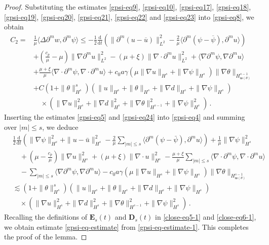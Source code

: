 \documentclass[10pt,a4paper]{amsart}
\def\d{\mathrm{d}}
\def\no{\nonumber}
\def\w{\mathfrak{w}}
\begin{document}
\begin{proof}
Substituting the estimates \eqref{gpsi-eq9}, \eqref{gpsi-eq10}, \eqref{gpsi-eq17}, \eqref{gpsi-eq18}, \eqref{gpsi-eq19}, \eqref{gpsi-eq20}, \eqref{gpsi-eq21}, \eqref{gpsi-eq22} and \eqref{gpsi-eq23} into \eqref{gpsi-eq8}, we obtain
\begin{equation}\label{gpsi-eq24}
\begin{aligned}
C_2 = &\frac{1}{\mu} \langle \Delta \partial^m w, \partial^m \psi \rangle \leq -\frac{1}{2} \frac{\d}{\d t} \left( \|\partial^m(u-\overline{u})\|_{L^2}^2 - \frac{2}{\mu} \langle \partial^m(\psi - \overline{\psi}), \partial^m u \rangle \right) \\
& + ( \frac{c_p}{\mu} - \mu ) \|\nabla \partial^m u\|_{L^2}^2 - (\mu+\xi) \|\nabla\cdot \partial^m u\|_{L^2}^2 + \langle \nabla \partial^m \psi, \nabla \partial^m u \rangle \\
& + \frac{\mu+\xi}{\mu} \langle \nabla \cdot\partial^m \psi, \nabla \cdot\partial^m u \rangle + c_0 a \gamma ( \mu \| \nabla u \|_{H^s} + \| \nabla \psi \|_{H^s} ) \| \nabla \theta \|_{H^{s-1}_{\w (\theta)}}\\
& + C (1 + \|\theta\|_{H^s}^s) (\|u\|_{H^s} + \|\theta\|_{H^s} + \|\nabla d\|_{H^s} + \|\nabla \psi\|_{H^s}) \\
&\quad \times (\|\nabla u\|_{H^s}^2 + \|\nabla d\|_{H^s}^2 + \|\nabla \theta\|_{H^{s-1}}^2 + \|\nabla \psi\|_{H^s}^2) \,.
\end{aligned}
\end{equation}
Inserting the estimates \eqref{gpsi-eq5} and \eqref{gpsi-eq24} into \eqref{gpsi-eq4} and summing over $|m|\le s$, we deduce
\begin{align}\label{gpsi-eq-estimate-1}
\no &\frac{1}{2} \frac{\d}{\d t} \left( \|\nabla \psi\|_{H^s}^2 + \|u - \bar{u}\|_{H^s}^2 - \frac{2}{\mu} \sum_{|m| \leq s} \langle \partial^m (\psi - \bar{\psi}), \partial^m u \rangle \right) + \frac{1}{ \mu} \|\nabla \psi\|_{H^s}^2 \\
\no & \quad + ( \mu - \frac{c_p}{\mu} ) \|\nabla u\|_{H^s}^2 + (\mu + \xi) \|\nabla \cdot u\|_{H^s}^2 - \frac{\mu + \xi}{\mu} \sum_{|m| \leq s} \langle \nabla \cdot \partial^m \psi, \nabla \cdot \partial^m u \rangle \\
& \quad- \sum_{|m| \leq s} \langle \nabla \partial^m \psi, \nabla \partial^m u \rangle - c_0 a \gamma ( \mu \| \nabla u \|_{H^s} + \| \nabla \psi \|_{H^s} ) \| \nabla \theta \|_{H^{s-1}_{\w (\theta)}} \\
\no & \lesssim \left( 1 + \|\theta\|_{H^s}^s \right) \left( \|u\|_{H^s} + \|\theta\|_{H^s} + \|\nabla d\|_{H^s} + \|\nabla \psi\|_{H^s} \right) \\
\no & \quad\times \left( \|\nabla u\|_{H^s}^2 + \|\nabla d\|_{H^s}^2 + \|\nabla \theta\|_{H^{s-1}}^2 + \|\nabla \psi\|_{H^s}^2 \right) \,.
\end{align}
Recalling the definitions of $\mathbf{E}_s(t)$ and $\mathbf{D}_s(t)$ in \eqref{close-eq5-1} and \eqref{close-eq6-1}, we obtain estimate \eqref{gpsi-eq-estimate} from \eqref{gpsi-eq-estimate-1}. This completes the proof of the lemma.
\end{proof}
\end{document}

